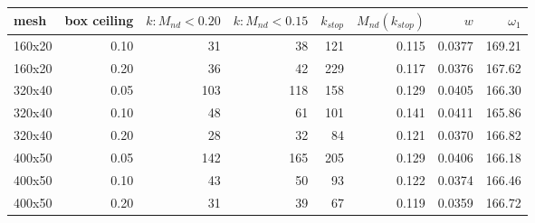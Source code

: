 \setlength{\tabcolsep}{3.5pt}
\begin{tabular}{lrrrrrrr}
\toprule
mesh & box ceiling & $k: M_{nd}<0.20$ & $k: M_{nd}<0.15$ & $k_{stop}$ & $M_{nd}(k_{stop})$ & $w$ & $\omega_1$ \\
\midrule
160x20 & 0.10 & 31 & 38 & 121 & 0.115 & 0.0377 & 169.21 \\
160x20 & 0.20 & 36 & 42 & 229 & 0.117 & 0.0376 & 167.62 \\
320x40 & 0.05 & 103 & 118 & 158 & 0.129 & 0.0405 & 166.30 \\
320x40 & 0.10 & 48 & 61 & 101 & 0.141 & 0.0411 & 165.86 \\
320x40 & 0.20 & 28 & 32 & 84 & 0.121 & 0.0370 & 166.82 \\
400x50 & 0.05 & 142 & 165 & 205 & 0.129 & 0.0406 & 166.18 \\
400x50 & 0.10 & 43 & 50 & 93 & 0.122 & 0.0374 & 166.46 \\
400x50 & 0.20 & 31 & 39 & 67 & 0.119 & 0.0359 & 166.72 \\
\bottomrule
\end{tabular}
